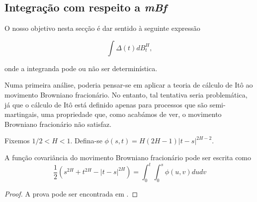 \documentclass{article}
\begin{document}
\subsection{Integração com respeito a \textit{mBf}}

\hspace{0.4cm} O nosso objetivo nesta secção é dar sentido à seguinte expressão 

$$\int \Delta(t) dB_t^H,$$

\noindent onde a integranda pode ou não ser determinística.

Numa primeira análise, poderia pensar-se em aplicar a teoria de cálculo de Itô ao movimento Browniano fracionário. No entanto, tal tentativa seria problemática, já que o cálculo de Itô está definido apenas para processos que são semi-martingais, uma propriedade que, como acabámos de ver, o movimento Browniano fracionário não satisfaz.
\vspace{0.5cm}

Fixemos $1/2<H<1$. Defina-se $\phi(s,t)=H(2H-1)|t-s|^{2H-2}$. 

\vspace{0.1cm}

\begin{prop}
    A função covariância do movimento Browniano fracionário pode ser escrita como
    $$\frac{1}{2}(s^{2H}+t^{2H}-|t-s|^{2H})=\int_0^t \int_0^s \phi(u,v) dudv$$
\end{prop}
\begin{proof}
     A prova pode ser encontrada em \cite{Inkaya2011}.
\end{proof}


\vspace{0.5cm}
\end{document}
